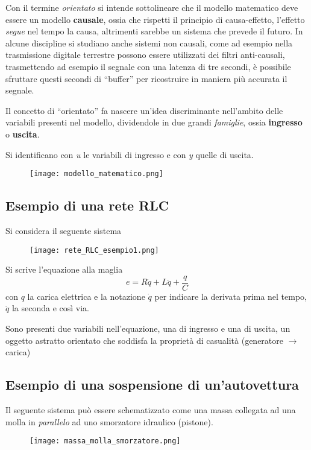 Con il termine \textit{orientato} si intende sottolineare che il modello matematico deve essere un
modello \textbf{causale}, ossia che rispetti il principio di causa-effetto, l'effetto
\textit{segue} nel tempo la causa, altrimenti sarebbe un sistema che prevede il futuro. In alcune
discipline si studiano anche sistemi non causali, come ad esempio nella trasmissione digitale
terrestre possono essere utilizzati dei filtri anti-causali, trasmettendo ad esempio il segnale con
una latenza di tre secondi, è possibile sfruttare questi secondi di ``buffer'' per ricostruire in
maniera più accurata il segnale.

Il concetto di ``orientato'' fa nascere un'idea discriminante nell'ambito delle variabili presenti
nel modello, dividendole in due grandi \textit{famiglie}, ossia
\textbf{ingresso} o \textbf{uscita}.

Si identificano con \textit{u} le variabili di ingresso e con \textit{y} quelle di uscita.
\begin{figure}[h]
 \centering
 \texttt{[image: modello\_matematico.png]}
 \label{Fig.:modello_matematico}
\end{figure}

\subsection{Esempio di una rete RLC}
Si considera il seguente sistema
 \begin{figure}[h]
 \centering
 \texttt{[image: rete\_RLC\_esempio1.png]}
 \label{Fig.:circuito_RLC}
\end{figure}
Si scrive l'equazione alla maglia
\begin{equation}
 e = R \dot{q} + L\ddot{q} + \frac{q}{C}
 \label{eq:equazione_RLC}
\end{equation}
con $q$ la carica elettrica e la notazione $\dot{q}$ per indicare la derivata prima nel tempo,
$\ddot{q}$ la seconda e così via.

Sono presenti due variabili nell'equazione, una di ingresso e una di uscita, un oggetto astratto
orientato che soddisfa la proprietà di casualità (generatore $\rightarrow$ carica)

\newpage
\subsection{Esempio di una sospensione di un'autovettura}
Il seguente sistema può essere schematizzato come una massa collegata ad una molla in
\textit{parallelo} ad uno smorzatore idraulico (pistone).
\begin{figure}[h]
 \centering \texttt{[image: massa\_molla\_smorzatore.png]}
 \label{Fig.:massa_molla_smorzatore}
\end{figure}

